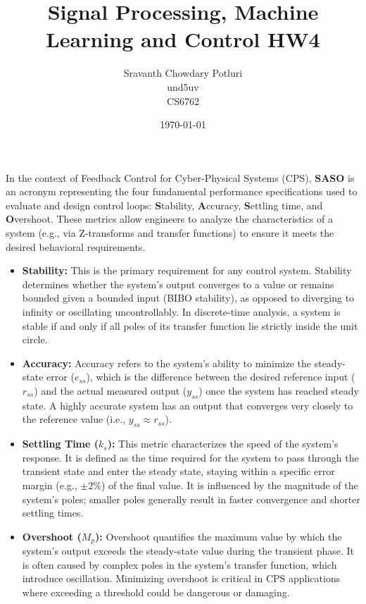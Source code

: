 \documentclass[a4paper,12pt]{article}
\title{Signal Processing, Machine Learning and Control HW4}
\author{Sravanth Chowdary Potluri \\ und5uv \\ CS6762}
\date{\today}
\begin{document}
\maketitle

\section{}

In the context of Feedback Control for Cyber-Physical Systems (CPS), \textbf{SASO} is an acronym representing the four fundamental performance specifications used to evaluate and design control loops: \textbf{S}tability, \textbf{A}ccuracy, \textbf{S}ettling time, and \textbf{O}vershoot. These metrics allow engineers to analyze the characteristics of a system (e.g., via Z-transforms and transfer functions) to ensure it meets the desired behavioral requirements.

\begin{itemize}
    \item \textbf{Stability:} This is the primary requirement for any control system. Stability determines whether the system's output converges to a value or remains bounded given a bounded input (BIBO stability), as opposed to diverging to infinity or oscillating uncontrollably. In discrete-time analysis, a system is stable if and only if all poles of its transfer function lie strictly inside the unit circle.

    \item \textbf{Accuracy:} Accuracy refers to the system's ability to minimize the steady-state error ($e_{ss}$), which is the difference between the desired reference input ($r_{ss}$) and the actual measured output ($y_{ss}$) once the system has reached steady state. A highly accurate system has an output that converges very closely to the reference value (i.e., $y_{ss} \approx r_{ss}$).

    \item \textbf{Settling Time ($k_s$):} This metric characterizes the speed of the system's response. It is defined as the time required for the system to pass through the transient state and enter the steady state, staying within a specific error margin (e.g., $\pm 2\%$) of the final value. It is influenced by the magnitude of the system's poles; smaller poles generally result in faster convergence and shorter settling times.

    \item \textbf{Overshoot ($M_p$):} Overshoot quantifies the maximum value by which the system's output exceeds the steady-state value during the transient phase. It is often caused by complex poles in the system's transfer function, which introduce oscillation. Minimizing overshoot is critical in CPS applications where exceeding a threshold could be dangerous or damaging.
\end{itemize}
\end{document}
